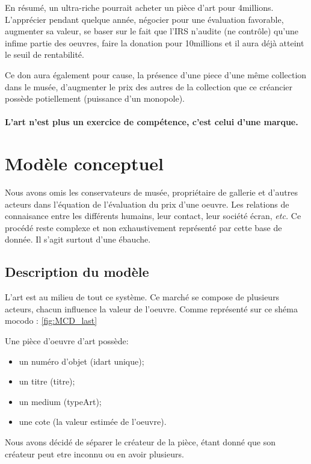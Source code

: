 \documentclass{article}
\begin{document}
        En résumé, un ultra-riche pourrait acheter un pièce d'art pour 4millions.
        L'apprécier pendant quelque année, négocier pour une évaluation favorable, augmenter sa valeur, se baser sur le fait que l'IRS n'audite (ne contrôle) qu'une infime partie des oeuvres, faire la donation pour 10millions et il aura déjà atteint le seuil de rentabilité.
        
        Ce don aura également pour cause, la présence d'une piece d'une même collection dans le musée, d'augmenter le prix des autres de la collection que ce créancier possède potiellement (puissance d'un monopole).

\paragraph{L'art n'est plus un exercice de compétence, c'est celui d'une marque.}


\section{Modèle conceptuel}


Nous avons omis les conservateurs de musée, propriétaire de gallerie et d'autres acteurs dans l'équation de l'évaluation du prix d'une oeuvre. 
Les relations de connaisance entre les différents humains, leur contact, leur société écran, \emph{etc.} 
Ce procédé reste complexe et non exhaustivement représenté par cette base de donnée.
Il s'agit surtout d'une ébauche.

\subsection{Description du modèle}

L'art est au milieu de tout ce système. 
Ce marché se compose de plusieurs acteurs, chacun influence la valeur de l'oeuvre.
Comme représenté sur ce shéma mocodo : \ref{fig:MCD_last}

Une pièce d'oeuvre d'art possède:
\begin{itemize}[label=\(\blacktriangleright\)]
    \item un numéro d'objet (idart unique);
    \item un titre (titre);
    \item un medium (typeArt);
    \item une cote (la valeur estimée de l'oeuvre).
\end{itemize}
Nous avons décidé de séparer le créateur de la pièce, étant donné que son créateur peut etre inconnu ou en avoir plusieurs.
\end{document}
